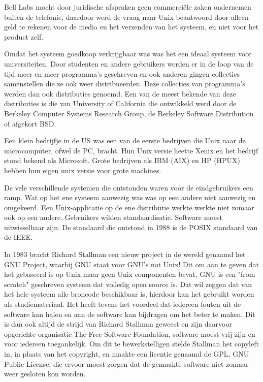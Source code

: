 Bell Labs mocht door juridische afspraken geen commerci\"ele zaken ondernemen buiten de telefonie, daardoor werd de
vraag naar Unix beantwoord door alleen geld te rekenen voor de media en het verzenden van het systeem, en niet voor het
product zelf.\par

Omdat het systeem goedkoop verkrijgbaar was was het een ideaal systeem voor universiteiten. Door studenten en andere
gebruikers werden er in de loop van de tijd meer en meer programma's geschreven en ook anderen gingen collecties
samenstellen die ze ook weer distribueerden. Deze collecties van programma's werden dan ook distributies genoemd. Een
van de meest bekende van deze distributies is die van University of California die ontwikkeld werd door de Berkeley
Computer Systems Research Group, de Berkeley Software Distribution of afgekort BSD.\par

Een klein bedrijfje in de US was een van de eerste bedrijven die Unix naar de microcomputer, ofwel de PC, bracht. Hun
Unix versie heette Xenix en het bedrijf stond bekend als Microsoft. Grote bedrijven als IBM (AIX) en HP
(HPUX) hebben hun eigen unix versie voor grote machines.\par

De vele verschillende systemen die ontstonden waren voor de eindgebruikers een ramp. Wat op het ene systeem aanwezig was
was op een andere niet aanwezig en omgekeerd. Een Unix-applicatie op de ene distributie werkte werkte niet zomaar ook
op een andere. Gebruikers wilden standaardisatie. Software moest uitwisselbaar zijn. De standaard die ontstond in 1988
is de POSIX standaard van de IEEE.\par

In 1983 bracht Richard Stallman een nieuw project in de wereld genaamd het GNU Project, waarbij GNU staat
voor GNU's not Unix! Dit om aan te geven dat het gebaseerd is op Unix maar geen Unix componenten bevat. GNU is een "from
scratch" geschreven systeem dat volledig open source is. Dat wil zeggen dat van het hele systeem alle broncode
beschikbaar is, hierdoor kan het gebruikt worden als studiemateriaal. Het heeft tevens het voordeel dat iedereen fouten
uit de software kan halen en aan de software kan bijdragen om het beter te maken. Dit is dan ook altijd de strijd van
Richard Stallman geweest en zijn daarvoor opgerichte organisatie The Free Software
Foundation, software moest vrij zijn en voor iedereen toegankelijk. Om dit te bewerkstelligen stelde Stallman het
copyleft in, in plaats van het copyright, en maakte een licentie genaamd de GPL, GNU Public
License, die ervoor moest zorgen dat de gemaakte software niet zomaar weer gesloten kon worden.\par

